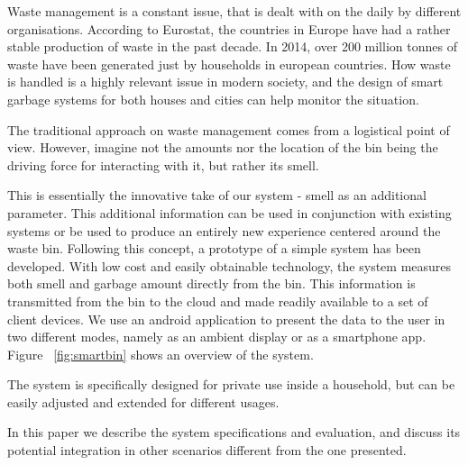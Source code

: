 Waste management is a constant issue, that is dealt with on the daily by different organisations.
According to Eurostat, the countries in Europe have had a rather stable production of waste in the past decade. In 2014, over 200 million tonnes of waste have been generated just by households in european countries\cite{eurostat}.
How waste is handled is a highly relevant issue in modern society, and the design of smart garbage systems for both houses and cities can help monitor the situation.

The traditional approach on waste management comes from a logistical point of view.
However, imagine not the amounts nor the location of the bin being the driving force for interacting with it, but rather its smell.

This is essentially the innovative take of our system - smell as an additional parameter.
This additional information can be used in conjunction with existing systems or be used to produce an entirely new experience centered around the waste bin.
Following this concept, a prototype of a simple system has been developed.
With low cost and easily obtainable technology, the system measures both smell and garbage amount directly from the bin.
This information is transmitted from the bin to the cloud and made readily available to a set of client devices.
We use an android application to present the data to the user in two different modes, namely as an ambient display or as a smartphone app.
Figure ~\ref{fig:smartbin} shows an overview of the system.

The system is specifically designed for private use inside a household, but can be easily adjusted and extended for different usages.

In this paper we describe the system specifications and evaluation, and discuss its potential integration in other scenarios different from the one presented.

